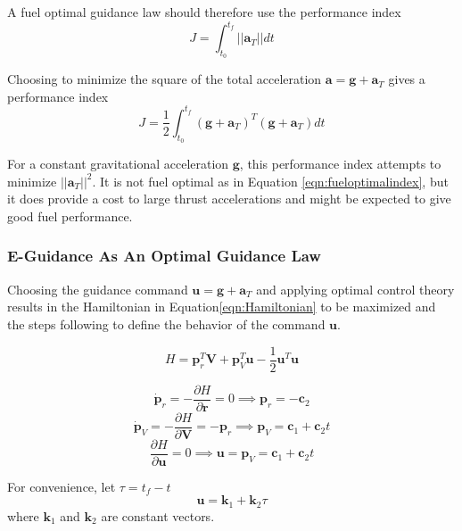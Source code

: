 A fuel optimal guidance law should therefore use the performance index
\begin{equation}
\label{eqn:fueloptimalindex}
J = \int_{t_0}^{t_f} ||\bm{a}_T||dt
\end{equation}

Choosing to minimize the square of the total acceleration $\bm{a} = \bm{g} + \bm{a}_T$ gives a performance index
\begin{equation}
\label{eqn:performanceindex}
J = \frac{1}{2} \int_{t_0}^{t_f} (\bm{g}+\bm{a}_T)^T(\bm{g}+\bm{a}_T)dt
\end{equation}

For a constant gravitational acceleration $\bm{g}$, this performance index attempts to minimize $||\bm{a}_T||^2$. It is not fuel optimal as in Equation \ref{eqn:fueloptimalindex}, but it does provide a cost to large thrust accelerations and might be expected to give good fuel performance.

\subsubsection{E-Guidance As An Optimal Guidance Law}
Choosing the guidance command $\bm{u} = \bm{g} + \bm{a}_T$ and applying optimal control theory results in the Hamiltonian in Equation\:\ref{eqn:Hamiltonian} to be maximized and the steps following to define the behavior of the command $\bm{u}$.

\begin{equation}
\label{eqn:Hamiltonian}
H = \bm{p}_r^T\bm{V} + \bm{p}_V^T\bm{u} - \frac{1}{2}\bm{u}^T\bm{u}
\end{equation}

\begin{equation*}
\dot{\bm{p}}_r = -\frac{\partial H}{\partial \bm{r}} = 0 \implies \bm{p}_r = -\bm{c}_2
\end{equation*}
\begin{equation*}
\dot{\bm{p}}_V = -\frac{\partial H}{\partial \bm{V}} = -\bm{p}_r \implies \bm{p}_V = \bm{c}_1 + \bm{c}_2 t
\end{equation*}
\begin{equation*}
\frac{\partial H}{\partial \bm{u}} = 0 \implies \bm{u} = \bm{p}_V = \bm{c}_1 + \bm{c}_2 t
\end{equation*}

For convenience, let $\tau = t_f - t$
\begin{equation}
\label{eqn:command}
\bm{u} = \bm{k}_1 + \bm{k}_2 \tau
\end{equation}
where $\bm{k}_1$ and $\bm{k}_2$ are constant vectors.

